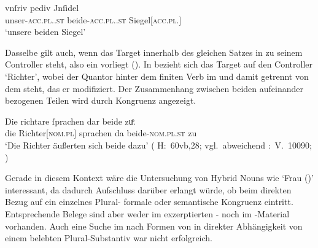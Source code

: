 \begin{exe}
\ex \label{ex:gendassgmt1_txt}
	\gll vnſriv pediv Jnſidel \\
		unser-\textsc{acc.pl.\NeutI.st} beide-\textsc{acc.pl.\NeutI.st}
			Siegel[\textsc{acc.pl.\NeutI}] \\
	\trans `unsere beiden Siegel'
		\parencites(Nr.~3224~A, Freising, 1299)[400,12--13]{cao4}
\end{exe}


Dasselbe gilt auch, wenn das Target innerhalb des gleichen Satzes in
 zu seinem Controller steht, also ein
 vorliegt (). In
 bezieht sich das Target  auf den Controller
 `Richter', wobei der Quantor hinter dem finiten Verb im
 und damit getrennt von dem  steht, das er
modifiziert. Der Zusammenhang zwischen beiden aufeinander bezogenen Teilen wird
durch Kongruenz angezeigt.

\begin{exe}
\ex \label{ex:gendassgmt2}
	\gll Die richtare ſprachen dar beide zuͦ. \\
		die Richter[\textsc{nom.pl\subM}] sprachen da
		beide-\textsc{nom.pl\subM.st} zu \\
	\trans `Die Richter äußerten sich beide dazu'
		(%
			H:~60vb,28; vgl.~abweichend
			\KC:~V.~10090;
			\cite[267]{schroeder1895}%
		)
\end{exe}

Gerade in diesem Kontext wäre die Untersuchung von Hybrid Nouns wie 
`Frau (\NeutF)' interessant, da dadurch Aufschluss darüber
erlangt würde, ob beim direkten Bezug auf ein einzelnes Plural-
formale oder semantische
Kongruenz eintritt. Entsprechende Belege sind aber
weder im exzerptierten \CAO{}- noch im \KC{}-Material vorhanden. Auch eine
Suche im \REM{} nach Formen von  in direkter Abhängigkeit von einem
belebten Plural-Substantiv war nicht erfolgreich.

